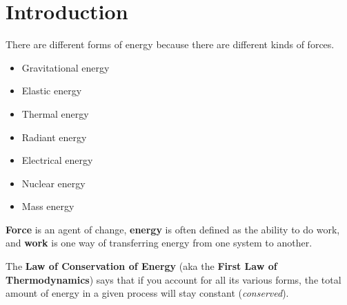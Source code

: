 \documentclass{article}
\begin{document}
\noindent

\section{Introduction}
There are different forms of energy because there are different kinds of forces. 
\begin{itemize}
    \item Gravitational energy
    \item Elastic energy
    \item Thermal energy
    \item Radiant energy
    \item Electrical energy
    \item Nuclear energy
    \item Mass energy
\end{itemize}
\begin{definition}
    \textbf{Force} is an agent of change, \textbf{energy} is often defined as the ability to do work, and \textbf{work} is one way of transferring energy from one system to another.
\end{definition}
The \textbf{Law of Conservation of Energy} (aka the \textbf{First Law of Thermodynamics}) says that if you account for all its various forms, the total amount of energy in a given process will stay constant (\textit{conserved}).
\end{document}
